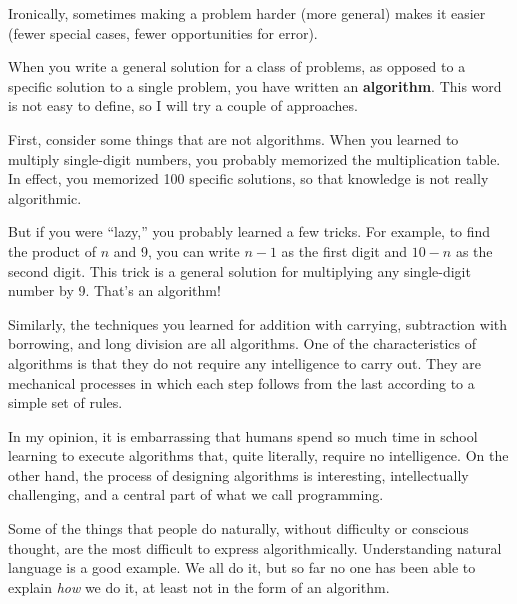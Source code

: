 Ironically, sometimes making a problem harder (more general)
makes it easier (fewer special cases, fewer opportunities for error).




When you write a general solution for a class of problems, as
opposed to a specific solution to a single problem, you have
written an {\bf algorithm}.  This word is
not easy to define, so I will try a couple of approaches.

First, consider some things that are not algorithms.  When you learned
to multiply single-digit numbers, you probably memorized the
multiplication table.  In effect, you memorized 100 specific
solutions, so that knowledge is not really algorithmic.

But if you were ``lazy,'' you probably learned a few
tricks.  For example, to find the product of $n$ and 9, you can
write $n-1$ as the first digit and $10-n$ as the second digit.  This
trick is a general solution for multiplying any single-digit number by 9.
That's an algorithm!

Similarly, the techniques you learned for addition with carrying,
subtraction with borrowing, and long division are all algorithms.  One
of the characteristics of algorithms is that they do not require any
intelligence to carry out.  They are mechanical processes in which
each step follows from the last according to a simple set of rules.

In my opinion, it is embarrassing that humans spend so much
time in school learning to execute algorithms that,
quite literally, require no intelligence.
%
On the other hand, the process of designing algorithms is
interesting, intellectually challenging, and a central part
of what we call programming.

Some of the things that people do naturally, without difficulty
or conscious thought, are the most difficult to express
algorithmically.  Understanding natural language is a good
example.  We all do it, but so far no one has been able to
explain {\em how} we do it, at least not in the form of an
algorithm.


